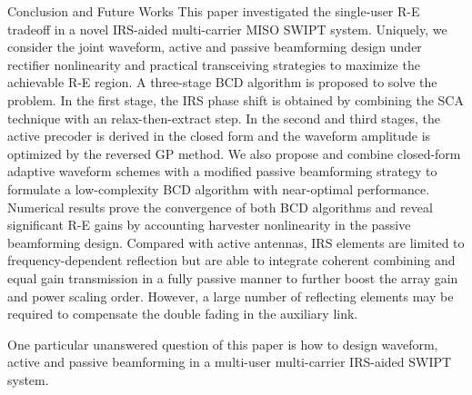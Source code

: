 \documentclass[journal]{IEEEtran}
\begin{document}
	\begin{section}{Conclusion and Future Works}\label{se:conclusion_and_future_works}
		This paper investigated the single-user R-E tradeoff in a novel IRS-aided multi-carrier MISO SWIPT system. Uniquely, we consider the joint waveform, active and passive beamforming design under rectifier nonlinearity and practical transceiving strategies to maximize the achievable R-E region. A three-stage BCD algorithm is proposed to solve the problem. In the first stage, the IRS phase shift is obtained by combining the SCA technique with an relax-then-extract step. In the second and third stages, the active precoder is derived in the closed form and the waveform amplitude is optimized by the reversed GP method. We also propose and combine closed-form adaptive waveform schemes with a modified passive beamforming strategy to formulate a low-complexity BCD algorithm with near-optimal performance. Numerical results prove the convergence of both BCD algorithms and reveal significant R-E gains by accounting harvester nonlinearity in the passive beamforming design. Compared with active antennas, IRS elements are limited to frequency-dependent reflection but are able to integrate coherent combining and equal gain transmission in a fully passive manner to further boost the array gain and power scaling order. However, a large number of reflecting elements may be required to compensate the double fading in the auxiliary link.

		One particular unanswered question of this paper is how to design waveform, active and passive beamforming in a multi-user multi-carrier IRS-aided SWIPT system.
	\end{section}


	
	
\end{document}
